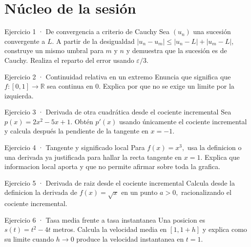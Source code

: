 \documentclass[10pt,a4paper,oneside,openany]{book}
\begin{document}
\section*{Núcleo de la sesión}
\begin{PSevenExerciseFixed}{Ejercicio 1 · De convergencia a criterio de Cauchy}
Sea \((u_n)\) una sucesión convergente a \(L\). A partir de la desigualdad \(|u_n-u_m|\le |u_n-L|+|u_m-L|\), construye un mismo umbral para \(m\) y \(n\) y demuestra que la sucesión es de Cauchy. Realiza el reparto del error usando \(\varepsilon/3\).
\end{PSevenExerciseFixed}
\begin{PSevenExerciseFixed}{Ejercicio 2 · Continuidad relativa en un extremo}
Enuncia que significa que \(f:[0,1]\to \mathbb{R}\) sea continua en \(0\). Explica por que no se exige un limite por la izquierda.
\end{PSevenExerciseFixed}
\begin{PSevenExerciseFixed}{Ejercicio 3 · Derivada de otra cuadrática desde el cociente incremental}
Sea \(p(x)=2x^{2}-5x+1\). Obtén \(p'(x)\) usando únicamente el cociente incremental y calcula después la pendiente de la tangente en \(x=-1\).
\end{PSevenExerciseFixed}
\begin{PSevenExerciseFixed}{Ejercicio 4 · Tangente y significado local}
Para \(f(x)=x^{3},\) usa la definicion o una derivada ya justificada para hallar la recta tangente en \(x=1\). Explica que informacion local aporta y que no permite afirmar sobre toda la grafica.
\end{PSevenExerciseFixed}
\begin{PSevenExerciseFixed}{Ejercicio 5 · Derivada de raiz desde el cociente incremental}
Calcula desde la definicion la derivada de \(f(x)=\sqrt{x}\) en un punto \(a>0,\) racionalizando el cociente incremental.
\end{PSevenExerciseFixed}
\begin{PSevenExerciseFixed}{Ejercicio 6 · Tasa media frente a tasa instantanea}
Una posicion es \(s(t)=t^{2}-4t\) metros. Calcula la velocidad media en \([1,1+h]\) y explica como su limite cuando \(h\to 0\) produce la velocidad instantanea en \(t=1\).
\end{PSevenExerciseFixed}
\end{document}
